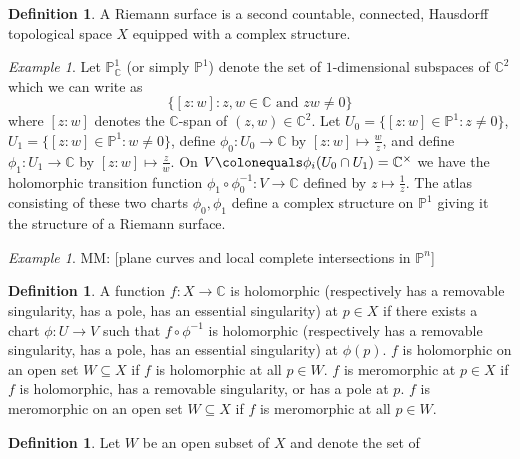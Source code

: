 \documentclass{dcthesis}
\newcommand{\PP}{\mathbb P}
\newcommand{\CC}{\mathbb C}
\newcommand{\defi}[1]{\textsf{#1}}
\newcommand{\mm}[1]{{\color{blue} \sf MM: [#1]}}
\numberwithin{equation}{section}
\theoremstyle{definition}
\newtheorem{definition}[equation]{Definition}
\theoremstyle{remark}
\newtheorem{example}[equation]{Example}
\begin{document}
{{    \begin{definition}
      \label{def:riemannsurface}
      A \defi{Riemann surface}
      is a second countable, connected,
      Hausdorff topological space $X$
      equipped with a complex structure.
    \end{definition}
    \begin{example}
      \label{exm:PP1}
      Let $\PP^1_\CC$ (or simply $\PP^1$)
      denote the set of $1$-dimensional subspaces of $\CC^2$
      which we can write as
      \[
        \{[z:w] : z,w\in\CC\text{ and }zw\ne 0\}
      \]
      where $[z:w]$ denotes the $\CC$-span of $(z,w)\in\CC^2$.
      Let $U_0 = \{[z:w]\in\PP^1 : z\neq 0\}$,
      $U_1 = \{[z:w]\in\PP^1 : w\neq 0\}$,
      define $\phi_0\colon U_0\to\CC$
      by $[z:w]\mapsto \frac{w}{z}$,
      and
      define $\phi_1\colon U_1\to\CC$
      by $[z:w]\mapsto \frac{z}{w}$.
      On $V\colonequals \phi_i(U_0\cap U_1) = \CC^\times$
      we have the holomorphic transition function
      $\phi_1\circ\phi_0^{-1}\colon V\to\CC$
      defined by $z\mapsto \frac{1}{z}$.
      The atlas consisting of these two charts $\phi_0,\phi_1$
      define a complex structure on $\PP^1$
      giving it the structure of a Riemann surface.
    \end{example}
    \begin{example}
      \label{exm:planecurves}
      \mm{plane curves and local complete intersections in $\PP^n$}
    \end{example}
    \begin{definition}
      \label{def:singularities}
      A function $f\colon X\to\CC$ is
      \defi{holomorphic
        (respectively has a removable singularity,
        has a pole, has an essential singularity)
      }
      at $p\in X$ if there exists a chart
      $\phi\colon U\to V$ such that
      $f\circ\phi^{-1}$ is
      holomorphic (respectively has a removable singularity, has a pole,
      has an essential singularity)
      at $\phi(p)$.
      $f$ is \defi{holomorphic on an open set $W\subseteq X$} if
      $f$ is holomorphic at all $p\in W$.
      $f$ is \defi{meromorphic} at $p\in X$
      if $f$ is holomorphic, has a removable singularity,
      or has a pole at $p$.
      $f$ is \defi{meromorphic on an open set $W\subseteq X$}
      if
      $f$ is meromorphic at all $p\in W$.
    \end{definition}
    \begin{definition}
      \label{def:laurentseries}
      Let $W$ be an open subset of $X$ and denote the set of

\end{definition}}}
\end{document}
